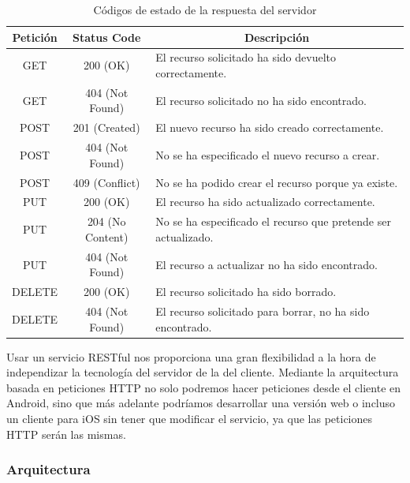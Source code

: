 \begin{table}[H]
\begin{tabular}{|c|c|m{7.5cm}|}
\hline
{\bf Petición} & {\bf Status Code} & \multicolumn{1}{c|}{{\bf Descripción}}                         \\ \hline
GET            & 200 (OK)          & El recurso solicitado ha sido devuelto correctamente.          \\ \hline
GET            & 404 (Not Found)   & El recurso solicitado no ha sido encontrado.                   \\ \hline
POST           & 201 (Created)     & El nuevo recurso ha sido creado correctamente.                 \\ \hline
POST           & 404 (Not Found)   & No se ha especificado el nuevo recurso a crear.                \\ \hline
POST           & 409 (Conflict)    & No se ha podido crear el recurso porque ya existe.             \\ \hline
PUT            & 200 (OK)          & El recurso ha sido actualizado correctamente.                  \\ \hline
PUT            & 204 (No Content)  & No se ha especificado el recurso que pretende ser actualizado. \\ \hline
PUT            & 404 (Not Found)   & El recurso a actualizar no ha sido encontrado.                 \\ \hline
DELETE         & 200 (OK)          & El recurso solicitado ha sido borrado.                         \\ \hline
DELETE         & 404 (Not Found)   & El recurso solicitado para borrar, no ha sido encontrado.      \\ \hline
\end{tabular}
\caption{Códigos de estado de la respuesta del servidor}
\label{fig:codeStateRestTable}
\end{table}

Usar un servicio RESTful nos proporciona una gran flexibilidad a la hora de independizar la tecnología del servidor de la del cliente. Mediante la arquitectura basada en peticiones HTTP no solo podremos hacer peticiones desde el cliente en Android, sino que más adelante podríamos desarrollar una versión web o incluso un cliente para iOS sin tener que modificar el servicio, ya que las peticiones HTTP serán las mismas.

\subsubsection{Arquitectura}

